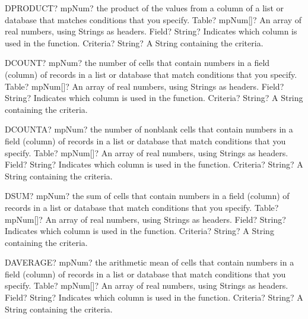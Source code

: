 \documentclass[12pt,a4paper,openany]{book}
\begin{document}
\begin{mpFunctionsExtract}
\mpWorksheetFunctionThreeNotImplemented
{DPRODUCT? mpNum? the product of the values from a column of a list or database that matches conditions that you specify.}
{Table? mpNum[]? An array of real numbers, using Strings as headers.}
{Field? String? Indicates which column is used in the function.}
{Criteria? String? A String containing the criteria.}
\end{mpFunctionsExtract}

\begin{mpFunctionsExtract}
\mpWorksheetFunctionThreeNotImplemented
{DCOUNT? mpNum? the number of cells that contain numbers in a field (column) of records in a list or database that match conditions that you specify.}
{Table? mpNum[]? An array of real numbers, using Strings as headers.}
{Field? String? Indicates which column is used in the function.}
{Criteria? String? A String containing the criteria.}
\end{mpFunctionsExtract}

\begin{mpFunctionsExtract}
\mpWorksheetFunctionThreeNotImplemented
{DCOUNTA? mpNum? the number of nonblank cells that contain numbers in a field (column) of records in a list or database that match conditions that you specify.}
{Table? mpNum[]? An array of real numbers, using Strings as headers.}
{Field? String? Indicates which column is used in the function.}
{Criteria? String? A String containing the criteria.}
\end{mpFunctionsExtract}

\begin{mpFunctionsExtract}
\mpWorksheetFunctionThreeNotImplemented
{DSUM? mpNum? the sum of cells that contain numbers in a field (column) of records in a list or database that match conditions that you specify.}
{Table? mpNum[]? An array of real numbers, using Strings as headers.}
{Field? String? Indicates which column is used in the function.}
{Criteria? String? A String containing the criteria.}
\end{mpFunctionsExtract}

\begin{mpFunctionsExtract}
\mpWorksheetFunctionThreeNotImplemented
{DAVERAGE? mpNum? the arithmetic mean of cells that contain numbers in a field (column) of records in a list or database that match conditions that you specify.}
{Table? mpNum[]? An array of real numbers, using Strings as headers.}
{Field? String? Indicates which column is used in the function.}
{Criteria? String? A String containing the criteria.}
\end{mpFunctionsExtract}
\end{document}
